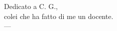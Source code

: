 \thispagestyle{empty}
{}

\vspace*{3cm}

\begin{center}
    Dedicato a C. G.,\\colei che ha fatto di me un docente. \\ \medskip
    --- \myDegree\myName
\end{center}
